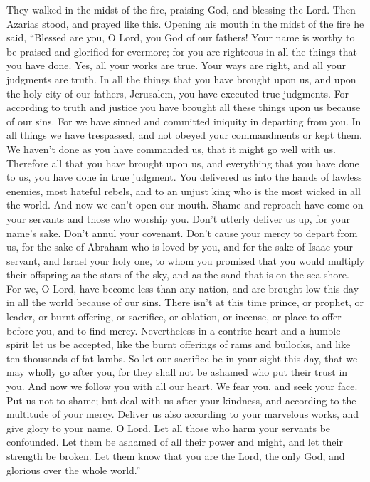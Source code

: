  They walked in the midst of the fire, praising God, and
blessing the Lord.  Then Azarias stood, and prayed like
this. Opening his mouth in the midst of the fire he said,
 ``Blessed are you, O Lord, you God of our fathers! Your
name is worthy to be praised and glorified for evermore; 
for you are righteous in all the things that you have done. Yes, all
your works are true. Your ways are right, and all your judgments are
truth.  In all the things that you have brought upon us,
and upon the holy city of our fathers, Jerusalem, you have executed true
judgments. For according to truth and justice you have brought all these
things upon us because of our sins.  For we have sinned
and committed iniquity in departing from you.  In all
things we have trespassed, and not obeyed your commandments or kept
them. We haven't done as you have commanded us, that it might go well
with us.  Therefore all that you have brought upon us,
and everything that you have done to us, you have done in true judgment.
 You delivered us into the hands of lawless enemies, most
hateful rebels, and to an unjust king who is the most wicked in all the
world.  And now we can't open our mouth. Shame and
reproach have come on your servants and those who worship you.
 Don't utterly deliver us up, for your name's sake. Don't
annul your covenant.  Don't cause your mercy to depart
from us, for the sake of Abraham who is loved by you, and for the sake
of Isaac your servant, and Israel your holy one,  to whom
you promised that you would multiply their offspring as the stars of the
sky, and as the sand that is on the sea shore.  For we, O
Lord, have become less than any nation, and are brought low this day in
all the world because of our sins.  There isn't at this
time prince, or prophet, or leader, or burnt offering, or sacrifice, or
oblation, or incense, or place to offer before you, and to find mercy.
 Nevertheless in a contrite heart and a humble spirit let
us be accepted,  like the burnt offerings of rams and
bullocks, and like ten thousands of fat lambs. So let our sacrifice be
in your sight this day, that we may wholly go after you, for they shall
not be ashamed who put their trust in you.  And now we
follow you with all our heart. We fear you, and seek your face.
 Put us not to shame; but deal with us after your
kindness, and according to the multitude of your mercy. 
Deliver us also according to your marvelous works, and give glory to
your name, O Lord. Let all those who harm your servants be confounded.
 Let them be ashamed of all their power and might, and
let their strength be broken.  Let them know that you are
the Lord, the only God, and glorious over the whole world.''

